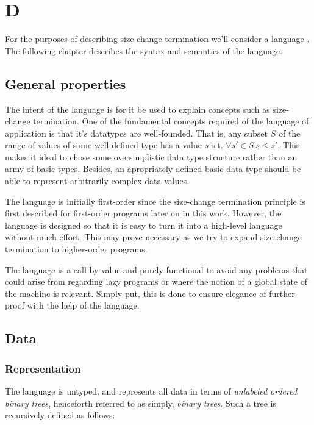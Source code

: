 \newcommand{\D}{D}
\chapter{\D}

For the purposes of describing size-change termination we'll consider a language
. The following chapter describes the syntax and semantics of the
language.

\section{General properties}

The intent of the language is for it be used to explain concepts such as
size-change termination. One of the fundamental concepts required of the
language of application is that it's datatypes are well-founded. That is, any
subset $S$ of the range of values of some well-defined type has a value $s$
s.t. $\forall {s'\in S}\ s\leq s'$. This makes it ideal to chose some
oversimplistic data type structure rather than an army of basic types. Besides,
an apropriately defined basic data type should be able to represent arbitrarily
complex data values.

The language is initially first-order since the size-change termination
principle is first described for first-order programs later on in this work.
However, the language is designed so that it is easy to turn it into a
high-level language without much effort. This may prove necessary as we try to
expand size-change termination to higher-order programs.

The language is a call-by-value and purely functional to avoid any problems
that could arise from regarding lazy programs or where the notion of a global
state of the machine is relevant. Simply put, this is done to ensure elegance
of further proof with the help of the language.





\section{Data}

\subsection{Representation}\label{section:d-data-representation}

The language  is untyped, and represents all data in terms of
\emph{unlabeled ordered binary trees}, henceforth referred to as simply,
\emph{binary trees}. Such a tree is recursively defined as follows:

